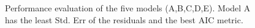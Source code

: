 \documentclass[a4paper,10pt]{article}
\begin{document}
\begin{figure}[ht]
\centering
  \qquad
  \caption{Performance evaluation of the five models (A,B,C,D,E). Model A has the least Std. Err of the residuals and the best AIC metric.}
\label{fig:modperf}
\end{figure}
\end{document}
